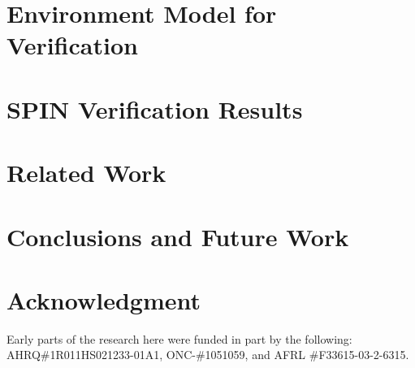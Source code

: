 \documentclass[conference]{IEEEtran}
\begin{document}
\section{Environment Model for Verification}
\label{sec:env}


\section{SPIN Verification Results}
\label{sec:results}


\section{Related Work}


\section{Conclusions and Future Work}


\section*{Acknowledgment}

Early parts of the research here were funded in part by the following:
AHRQ\#1R011HS021233-01A1, ONC-\#1051059, and  AFRL \#F33615-03-2-6315.


{\small 
}
\end{document}

